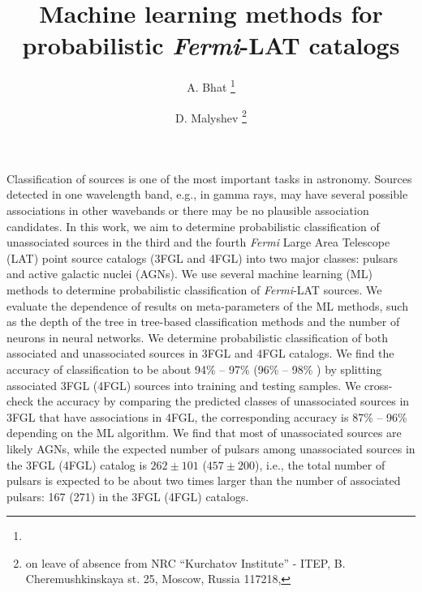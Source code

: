 \documentclass[preprint]{aa}
\newcommand{\Fermi}{\textit{Fermi}\xspace}
\begin{document}
 


   \title{Machine learning methods for probabilistic \Fermi-LAT catalogs}


   \author{A. Bhat \thanks{}
          \and
          D. Malyshev \thanks{on leave of absence from NRC ``Kurchatov Institute'' - ITEP, B. Cheremushkinskaya st. 25, Moscow, Russia 117218, 
          }
          }




 
\abstract
{
Classification of sources is one of the most important tasks in astronomy.
Sources detected in one wavelength band, e.g., in gamma rays, may have several possible associations in other wavebands or
there may be no plausible association candidates.
}
{
In this work, we aim to determine probabilistic classification of unassociated sources in the third and the fourth \Fermi Large Area Telescope (LAT) point source catalogs (3FGL and 4FGL) into two major classes: pulsars and active galactic nuclei (AGNs).
}
{
We use several machine learning (ML) methods to determine probabilistic classification of \Fermi-LAT sources.
We evaluate the dependence of results on meta-parameters of the ML methods, such as the depth of the tree in tree-based classification methods and the number of neurons in neural networks.
}
{
We determine probabilistic classification of both associated and unassociated sources in 3FGL and 4FGL catalogs.
We find the accuracy of classification to be about 94\% -- 97\% (96\% -- 98\% ) by splitting associated 3FGL (4FGL) sources into training and testing samples.
We cross-check the accuracy by comparing the predicted classes of unassociated sources in 3FGL that have associations in 4FGL,
the corresponding accuracy is 87\% -- 96\% depending on the ML algorithm.
We find that most of unassociated sources are likely AGNs, while the expected number of pulsars among unassociated sources in the 3FGL (4FGL) catalog is $262 \pm 101$ ($457 \pm 200$), i.e., the total number of pulsars is expected to be about two times larger than the number of associated pulsars: 167 (271) in the 3FGL (4FGL) catalogs.
}
{}
\end{document}
